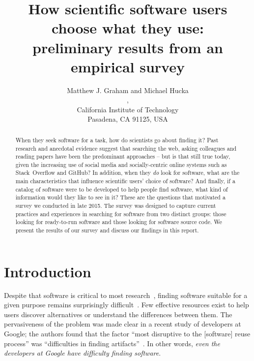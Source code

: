 \documentclass{casicswhitepaper}
\begin{document}
\title{How scientific software users choose what they use:\\
preliminary results from an empirical survey}
\date{\dateAndVersion}
\author{Matthew J. Graham and Michael Hucka\\
,\quad{}\\
California Institute of Technology\\
Pasadena, CA 91125, USA}
\maketitle

\begin{abstract}
When they seek software for a task, how do scientists go about finding it?  Past research and anecdotal evidence suggest that searching the web, asking colleagues and reading papers have been the predominant approaches -- but is that still true today, given the increasing use of social media and socially-centric online systems such as Stack~Overflow and GitHub?  In addition, when they \emph{do} look for software, what are the main characteristics that influence scientific users' choice of software?  And finally, if a catalog of software were to be developed to help people find software, what kind of information would they like to see in it?  These are the questions that motivated a survey we conducted in late 2015.  The survey was designed to capture current practices and experiences in searching for software from two distinct groups: those looking for ready-to-run software and those looking for software source code.  We present the results of our survey and discuss our findings in this report.
\end{abstract}


\section{Introduction}

Despite that software is critical to most research~\citep{bauer2014exploratory, hettrick_2014, hannay_2009, baxter_2006, wilson_2006}, finding software suitable for a given purpose remains surprisingly difficult~\cite{cannata_2005, Bourne::2015, SoftwareDiscoveryIndex:2014}.  Few effective resources exist to help users discover alternatives or understand the differences between them.  The pervasiveness of the problem was made clear in a recent study of developers at Google; the authors found that the factor ``most disruptive to the [software] reuse process'' was ``difficulties in finding artifacts''~\cite{bauer2014exploratory}.  In other words, \emph{even the developers at Google have difficulty finding software}.
\end{document}
